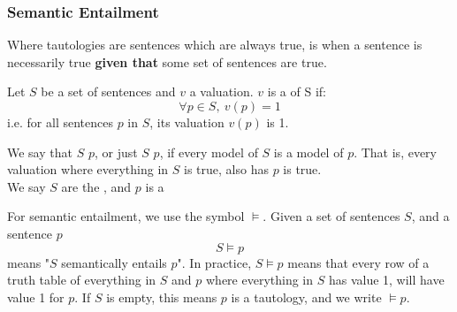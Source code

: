 \documentclass[11pt]{article}
\begin{document}
\subsubsection{Semantic Entailment}
Where tautologies are sentences which are always true,  is when a sentence is necessarily true \textbf{given that} some set of sentences are true. 
\begin{defi}[Model]
    Let $S$ be a set of sentences and $v$ a valuation. $v$ is a  of S if:
    \[\forall p \in S, \ v(p) = 1 \] 
    i.e. for all sentences $p$ in $S$, its valuation $v(p)$ is 1.
\end{defi}
\begin{defi}
    We say that $S$  $p$, or just $S$  $p$, if every model of $S$ is a model of $p$. That is, every valuation where everything in $S$ is true, also has $p$ is true.
    \\ We say $S$ are the , and $p$ is a 
\end{defi}
For semantic entailment, we use the symbol $\vDash$. Given a set of sentences $S$, and a sentence $p$ 
\[ S \vDash p \]
means "$S$ semantically entails $p$". In practice, $S \vDash p$ means that every row of a truth table of everything in $S$ and $p$ where everything in $S$ has value 1, will have value 1 for $p$. If $S$ is empty, this means $p$ is a tautology, and we write $\vDash p$.
\end{document}
